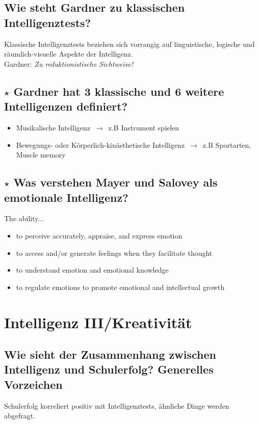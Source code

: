 \documentclass[a4paper,9pt,DIV=14]{scrartcl}
\begin{document}
\subsection{Wie steht Gardner zu klassischen Intelligenztests?}
Klassische Intelligenztests beziehen sich vorrangig auf linguistische, logische und
räumlich-visuelle Aspekte der Intelligenz.\\
Gardner: \textit{Zu reduktionistische Sichtweise!}
\subsection{$\star$ Gardner hat 3 klassische und 6 weitere Intelligenzen definiert?} %
\begin{itemize}
\item Musikalische Intelligenz $\,\to\,$ z.B Instrument spielen
\item Bewegungs- oder Körperlich-kinästhetische Intelligenz $\,\to\,$ z.B Sportarten, Muscle memory
\end{itemize}
\subsection{$\star$ Was verstehen Mayer und Salovey als emotionale Intelligenz?} %
The ability...
\begin{itemize}
\item to perceive accurately, appraise, and express emotion
\item to access and/or generate feelings when they facilitate thought
\item to understand emotion and emotional knowledge
\item to regulate emotions to promote emotional and intellectual growth
\end{itemize}

\section{Intelligenz III/Kreativität}

\subsection{Wie sieht der Zusammenhang zwischen Intelligenz und Schulerfolg? Generelles Vorzeichen}
    Schulerfolg korreliert positiv mit Intelligenztests, ähnliche Dinge werden abgefragt.
\end{document}

